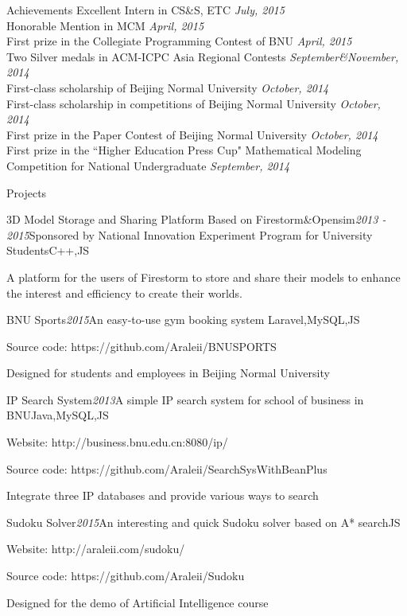 \documentclass{resume} %
\begin{document}
\begin{rSection}{Achievements}
{Excellent Intern in CS\&S, ETC} \hfill {\em July, 2015}\\
{Honorable Mention in MCM } \hfill {\em April, 2015} \\ 
{First prize in the Collegiate Programming Contest of BNU} \hfill {\em April, 2015} \\ 
{Two Silver medals in  ACM-ICPC Asia Regional Contests} \hfill {\em September\&November, 2014} \\
{First-class scholarship of Beijing Normal University     } \hfill {\em October, 2014} \\
{First-class scholarship in competitions of Beijing Normal University     } \hfill {\em October, 2014} \\
{First prize in the Paper Contest of Beijing Normal University     } \hfill {\em October, 2014} \\
{First prize in the ``Higher Education Press Cup" Mathematical Modeling Competition for National Undergraduate} \hfill {\em September, 2014}
\end{rSection}

\begin{rSection}{Projects}
\begin{rSubsection}{3D Model Storage and Sharing Platform Based on Firestorm\&Opensim}{ {\em 2013 - 2015}}{Sponsored by National Innovation Experiment Program for University Students}{C++,JS}
	\item A platform for the users of Firestorm to store and share their models to enhance the interest and efficiency to create their worlds.
\end{rSubsection}	
\begin{rSubsection}{BNU Sports}{ {\em 2015}}{An easy-to-use gym booking system }{Laravel,MySQL,JS}
	\item Source code: https://github.com/Araleii/BNUSPORTS
	\item Designed for students and employees in Beijing Normal University
\end{rSubsection}
\begin{rSubsection}{IP Search System}{ {\em 2013}}{A simple IP search system for school of business in BNU}{Java,MySQL,JS}
	\item Website: http://business.bnu.edu.cn:8080/ip/
	\item Source code: https://github.com/Araleii/SearchSysWithBeanPlus
	\item Integrate three IP databases and provide various ways to search 
\end{rSubsection}		
\begin{rSubsection}{Sudoku Solver}{ {\em 2015}}{An interesting and quick Sudoku solver based on A* search}{JS}
	\item Website: http://araleii.com/sudoku/
	\item Source code: https://github.com/Araleii/Sudoku
	\item Designed for the demo of Artificial Intelligence course
\end{rSubsection}	
\end{rSection}
\end{document}
